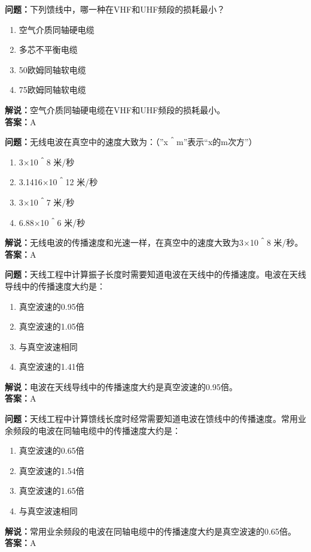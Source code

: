 \documentclass[UTF8]{ctexbook}
\begin{document}
\textbf{问题：}下列馈线中，哪一种在VHF和UHF频段的损耗最小？
\begin{enumerate}[label=\Alph*), leftmargin=3em]
  \item 空气介质同轴硬电缆
  \item 多芯不平衡电缆
  \item 50欧姆同轴软电缆
  \item 75欧姆同轴软电缆
\end{enumerate}
\textbf{解说：}空气介质同轴硬电缆在VHF和UHF频段的损耗最小。\\
\textbf{答案：}A

\textbf{问题：}无线电波在真空中的速度大致为：（”x＾m”表示“x的m次方”）
\begin{enumerate}[label=\Alph*), leftmargin=3em]
  \item 3×10＾8 米/秒
  \item 3.1416×10＾12 米/秒
  \item 3×10＾7 米/秒
  \item 6.88×10＾6 米/秒
\end{enumerate}
\textbf{解说：}无线电波的传播速度和光速一样，在真空中的速度大致为3×10＾8 米/秒。\\
\textbf{答案：}A

\textbf{问题：}天线工程中计算振子长度时需要知道电波在天线中的传播速度。电波在天线导线中的传播速度大约是：
\begin{enumerate}[label=\Alph*), leftmargin=3em]
  \item 真空波速的0.95倍
  \item 真空波速的1.05倍
  \item 与真空波速相同
  \item 真空波速的1.41倍
\end{enumerate}
\textbf{解说：}电波在天线导线中的传播速度大约是真空波速的0.95倍。\\
\textbf{答案：}A

\textbf{问题：}天线工程中计算馈线长度时经常需要知道电波在馈线中的传播速度。常用业余频段的电波在同轴电缆中的传播速度大约是：
\begin{enumerate}[label=\Alph*), leftmargin=3em]
  \item 真空波速的0.65倍
  \item 真空波速的1.54倍
  \item 真空波速的1.65倍
  \item 与真空波速相同
\end{enumerate}
\textbf{解说：}常用业余频段的电波在同轴电缆中的传播速度大约是真空波速的0.65倍。\\
\textbf{答案：}A
\end{document}
